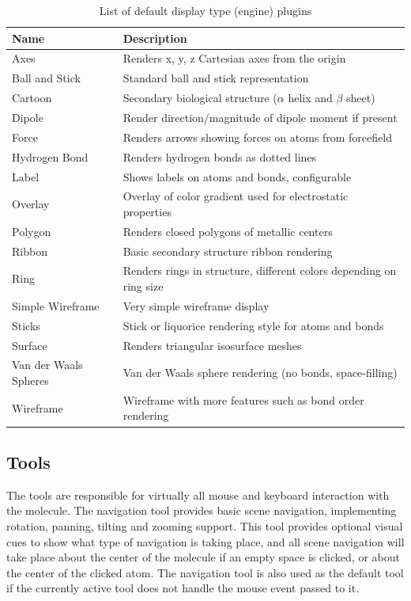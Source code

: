 \documentclass[10pt]{bmc_article}
\newenvironment{bmcformat}{\begin{raggedright}
\baselineskip20pt\sloppy\setboolean{publ}{false}}{\end{raggedright}
\baselineskip20pt\sloppy}
\begin{document}
\begin{bmcformat}
\begin{table}
\caption{List of default display type (engine) plugins}
\begin{tabular}{l | l}
\hline
Name & Description \\
\hline
Axes & Renders x, y, z Cartesian axes from the origin \\
Ball and Stick & Standard ball and stick representation \\
Cartoon & Secondary biological structure ($\alpha$ helix and $\beta$ sheet) \\
Dipole & Render direction/magnitude of dipole moment if present \\
Force & Renders arrows showing forces on atoms from forcefield \\
Hydrogen Bond & Renders hydrogen bonds as dotted lines \\
Label & Shows labels on atoms and bonds, configurable \\
Overlay & Overlay of color gradient used for electrostatic properties \\
Polygon & Renders closed polygons of metallic centers \\
Ribbon & Basic secondary structure ribbon rendering \\
Ring & Renders rings in structure, different colors depending on ring size \\
Simple Wireframe & Very simple wireframe display \\
Sticks & Stick or liquorice rendering style for atoms and bonds \\
Surface &Renders triangular isosurface meshes \\
Van der Waals Spheres & Van der Waals sphere rendering (no bonds, space-filling) \\
Wireframe & Wireframe with more features such as bond order rendering \\
\hline
\end{tabular}
\end{table}

\subsection{Tools}

The tools are responsible for virtually all mouse and keyboard interaction with
the molecule. The navigation tool provides basic scene navigation, implementing
rotation, panning, tilting and zooming support. This tool provides optional
visual cues to show what type of navigation is taking place, and all scene
navigation will take place about the center of the molecule if an empty space is
clicked, or about the center of the clicked atom. The navigation tool is also
used as the default tool if the currently active tool does not handle the mouse
event passed to it.


\end{bmcformat}
\end{document}
